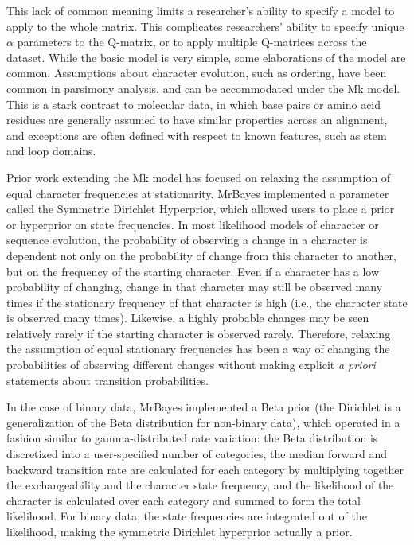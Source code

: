 \documentclass[]{article}
\begin{document}
	This lack of common meaning limits a researcher's ability to specify a model to apply to the whole matrix.
	This complicates researchers' ability to specify unique $\alpha$ parameters to the Q-matrix, or to apply multiple Q-matrices across the dataset.
	While the basic model is very simple, some elaborations of the model are common.
	Assumptions about character evolution, such as ordering, have been common in parsimony analysis, and can be accommodated under the Mk model. 
	This is a stark contrast to molecular data, in which base pairs or amino acid residues are generally assumed to have similar properties across an alignment, and exceptions are often defined with respect to known features, such as stem and loop domains. 
\par
Prior work extending the Mk model has focused on relaxing the assumption of equal character frequencies at stationarity.
MrBayes implemented a parameter called the Symmetric Dirichlet Hyperprior, which allowed users to place a prior or hyperprior on state frequencies. 
In most likelihood models of character or sequence evolution, the probability of observing a change in a character is dependent not only on the probability of change from this character to another, but on the frequency of the starting character.
Even if a character has a low probability of changing, change in that character may still be observed many times if the stationary frequency of that character is high (i.e., the character state is observed many times). 
Likewise, a highly probable changes may be seen relatively rarely if the starting character is observed rarely. 
Therefore, relaxing the assumption of equal stationary frequencies has been a way of changing the probabilities of observing different changes without making explicit \textit{a priori} statements about transition probabilities. \par
In the case of binary data, MrBayes implemented a Beta prior (the Dirichlet is a generalization of the Beta distribution for non-binary data), which operated in a fashion similar to gamma-distributed rate variation: the Beta distribution is discretized into a user-specified number of categories, the median forward and backward transition rate are calculated for each category by multiplying together the exchangeability and the character state frequency, and the likelihood of the character is calculated over each category and summed to form the total likelihood. 
For binary data, the state frequencies are integrated out of the likelihood, making the symmetric Dirichlet hyperprior actually a prior.
\end{document}
